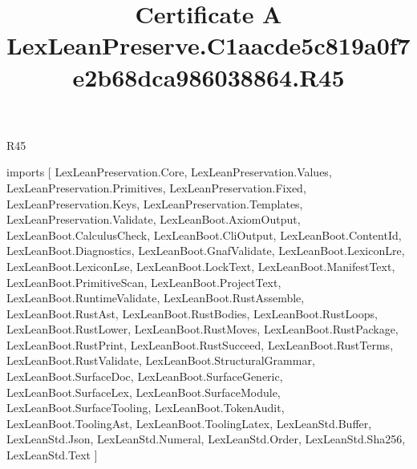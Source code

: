 \begin{lexlean}{R45}
\title{Certificate A LexLeanPreserve.C1aacde5c819a0f7e2b68dca986038864.R45}
\begin{coremodule}
imports [
  LexLeanPreservation.Core,
  LexLeanPreservation.Values,
  LexLeanPreservation.Primitives,
  LexLeanPreservation.Fixed,
  LexLeanPreservation.Keys,
  LexLeanPreservation.Templates,
  LexLeanPreservation.Validate,
  LexLeanBoot.AxiomOutput,
  LexLeanBoot.CalculusCheck,
  LexLeanBoot.CliOutput,
  LexLeanBoot.ContentId,
  LexLeanBoot.Diagnostics,
  LexLeanBoot.GnafValidate,
  LexLeanBoot.LexiconLre,
  LexLeanBoot.LexiconLse,
  LexLeanBoot.LockText,
  LexLeanBoot.ManifestText,
  LexLeanBoot.PrimitiveScan,
  LexLeanBoot.ProjectText,
  LexLeanBoot.RuntimeValidate,
  LexLeanBoot.RustAssemble,
  LexLeanBoot.RustAst,
  LexLeanBoot.RustBodies,
  LexLeanBoot.RustLoops,
  LexLeanBoot.RustLower,
  LexLeanBoot.RustMoves,
  LexLeanBoot.RustPackage,
  LexLeanBoot.RustPrint,
  LexLeanBoot.RustSucceed,
  LexLeanBoot.RustTerms,
  LexLeanBoot.RustValidate,
  LexLeanBoot.StructuralGrammar,
  LexLeanBoot.SurfaceDoc,
  LexLeanBoot.SurfaceGeneric,
  LexLeanBoot.SurfaceLex,
  LexLeanBoot.SurfaceModule,
  LexLeanBoot.SurfaceTooling,
  LexLeanBoot.TokenAudit,
  LexLeanBoot.ToolingAst,
  LexLeanBoot.ToolingLatex,
  LexLeanStd.Buffer,
  LexLeanStd.Json,
  LexLeanStd.Numeral,
  LexLeanStd.Order,
  LexLeanStd.Sha256,
  LexLeanStd.Text
]


\end{coremodule}
\end{lexlean}
